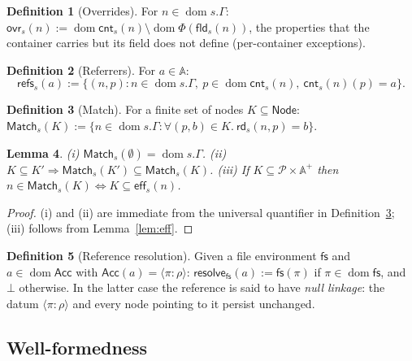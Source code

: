 \documentclass[11pt,a4paper]{article}
\theoremstyle{definition}
\newtheorem{definition}{Definition}[section]
\theoremstyle{plain}
\newtheorem{lemma}[definition]{Lemma}
\theoremstyle{remark}
\newcommand{\Adr}{\mathbb{A}}
\newcommand{\Prp}{\mathcal{P}}
\newcommand{\Nod}{\mathsf{Node}}
\newcommand{\tRef}{\rho}
\newcommand{\dom}{\operatorname{dom}}
\newcommand{\rd}{\mathsf{rd}}
\newcommand{\eff}{\mathsf{eff}}
\newcommand{\fld}{\mathsf{fld}}
\newcommand{\cnt}{\mathsf{cnt}}
\newcommand{\ovr}{\mathsf{ovr}}
\newcommand{\refs}{\mathsf{refs}}
\newcommand{\Match}{\mathsf{Match}}
\newcommand{\Acc}{\mathsf{Acc}}
\newcommand{\datum}[2]{\langle #1\!:\!#2\rangle}
\begin{document}
\begin{definition}[Overrides]\label{def:overrides}
For $n\in\dom s.\Gamma$: $\ovr_s(n):=\dom\cnt_s(n)\setminus\dom\Phi(\fld_s(n))$,
the properties that the container carries but its field does not define (per-container exceptions).
\end{definition}

\begin{definition}[Referrers]\label{def:refs}
For $a\in\Adr$:
\[
\refs_s(a):=\{(n,p) : n\in\dom s.\Gamma,\ p\in\dom\cnt_s(n),\ \cnt_s(n)(p)=a\}.
\]
\end{definition}

\begin{definition}[Match]\label{def:match}
For a finite set of nodes $K\subseteq\Nod$:
$\Match_s(K):=\{n\in\dom s.\Gamma : \forall (p,b)\in K.\ \rd_s(n,p)=b\}$.
\end{definition}

\begin{lemma}\label{lem:match}
(i) $\Match_s(\emptyset)=\dom s.\Gamma$.
(ii) $K\subseteq K'\Rightarrow\Match_s(K')\subseteq\Match_s(K)$.
(iii) If $K\subseteq\Prp\times\Adr^{+}$ then $n\in\Match_s(K)\iff K\subseteq\eff_s(n)$.
\end{lemma}
\begin{proof}
(i) and (ii) are immediate from the universal quantifier in Definition~\ref{def:match};
(iii) follows from Lemma~\ref{lem:eff}.
\end{proof}

\begin{definition}[Reference resolution]\label{def:resolve}
Given a file environment $\mathsf{fs}$ and $a\in\dom\Acc$ with $\Acc(a)=\datum{\pi}{\tRef}$:
$\mathsf{resolve}_{\mathsf{fs}}(a):=\mathsf{fs}(\pi)$ if $\pi\in\dom\mathsf{fs}$, and $\bot$ otherwise.
In the latter case the reference is said to have \emph{null linkage}: the datum $\datum{\pi}{\tRef}$ and
every node pointing to it persist unchanged.
\end{definition}

\subsection{Well-formedness}
\end{document}
